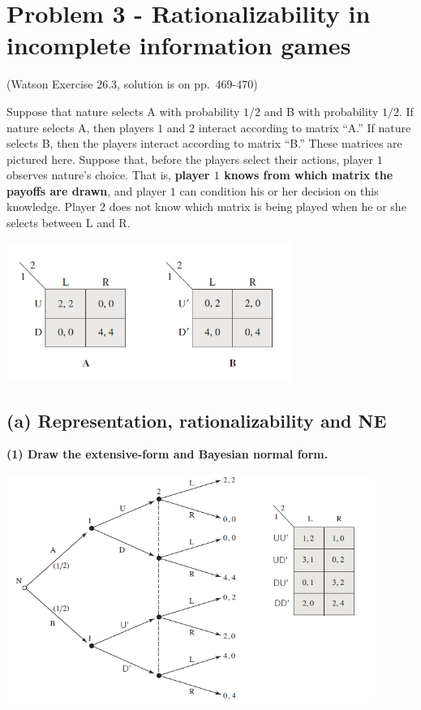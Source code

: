 \documentclass{article}
\begin{document}
\newpage

\section{Problem 3 - Rationalizability in incomplete information games}

(Watson Exercise 26.3, solution is on pp.~469-470)

Suppose that nature selects A with probability $1/2$ and B with probability
$1/2$. If nature selects A, then players $1$ and $2$ interact according to matrix
``A.'' If nature selects B, then the players interact according to matrix ``B.''
These matrices are pictured here. Suppose that, before the players select
their actions, player $1$ observes nature's choice. That is, \textbf{player $1$ knows
from which matrix the payoffs are drawn}, and player $1$ can condition his
or her decision on this knowledge. Player $2$ does not know which matrix is
being played when he or she selects between L and R.

\begin{center}
\includegraphics[width=0.7\textwidth]{9.q26_3}
\end{center}
\vspace{2mm}



\subsection*{(a) Representation, rationalizability and NE} 

\textbf{(1) Draw the extensive-form and Bayesian normal form. }

\begin{center}
\includegraphics[width=0.9\textwidth]{9.q26_3_a}
\end{center}
\end{document}
